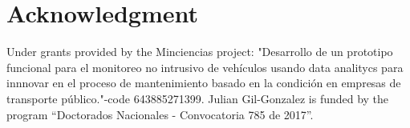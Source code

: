 \documentclass[journal]{IEEEtran}
\begin{document}
%






\section*{Acknowledgment}
Under grants provided by the Minciencias project: "Desarrollo de un prototipo funcional para el monitoreo no intrusivo de veh\'iculos
usando data analitycs para innnovar en el proceso de mantenimiento basado en la condici\'on en empresas de transporte p\'ublico."-code 643885271399. Julian Gil-Gonzalez is funded by the program ``Doctorados Nacionales - Convocatoria 785 de 2017''.


\ifCLASSOPTIONcaptionsoff
  \newpage
\fi



\end{document}
